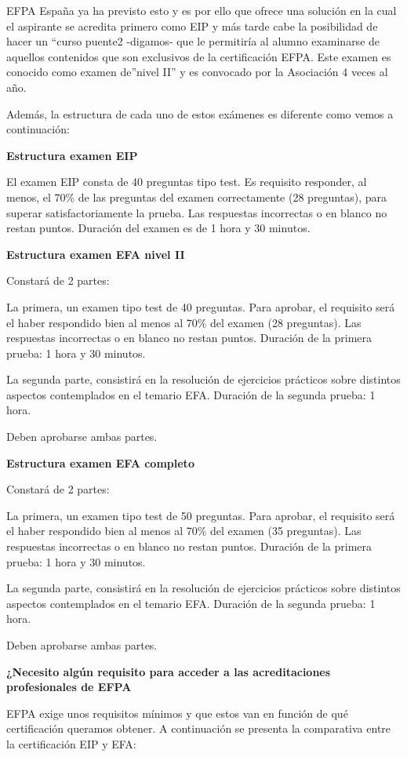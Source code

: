 \documentclass[
  letterpaper,
  DIV=11,
  numbers=noendperiod]{scrreprt}
\begin{document}
EFPA España ya ha previsto esto y es por ello que ofrece una solución en
la cual el aspirante se acredita primero como EIP y más tarde cabe la
posibilidad de hacer un ``curso puente2 -digamos- que le permitiría al
alumno examinarse de aquellos contenidos que son exclusivos de la
certificación EFPA. Este examen es conocido como examen de''nivel II'' y
es convocado por la Asociación 4 veces al año.

Además, la estructura de cada uno de estos exámenes es diferente como
vemos a continuación:

\textbf{Estructura examen EIP}

El examen EIP consta de 40 preguntas tipo test. Es requisito responder,
al menos, el 70\% de las preguntas del examen correctamente (28
preguntas), para superar satisfactoriamente la prueba. Las respuestas
incorrectas o en blanco no restan puntos. Duración del examen es de 1
hora y 30 minutos.

\textbf{Estructura examen EFA nivel II}

Constará de 2 partes:

La primera, un examen tipo test de 40 preguntas. Para aprobar, el
requisito será el haber respondido bien al menos al 70\% del examen (28
preguntas). Las respuestas incorrectas o en blanco no restan puntos.
Duración de la primera prueba: 1 hora y 30 minutos.

La segunda parte, consistirá en la resolución de ejercicios prácticos
sobre distintos aspectos contemplados en el temario EFA. Duración de la
segunda prueba: 1 hora.

Deben aprobarse ambas partes.

\textbf{Estructura examen EFA completo}

Constará de 2 partes:

La primera, un examen tipo test de 50 preguntas. Para aprobar, el
requisito será el haber respondido bien al menos al 70\% del examen (35
preguntas). Las respuestas incorrectas o en blanco no restan puntos.
Duración de la primera prueba: 1 hora y 30 minutos.

La segunda parte, consistirá en la resolución de ejercicios prácticos
sobre distintos aspectos contemplados en el temario EFA. Duración de la
segunda prueba: 1 hora.

Deben aprobarse ambas partes.

\textbf{¿Necesito algún requisito para acceder a las acreditaciones
profesionales de EFPA}

EFPA exige unos requisitos mínimos y que estos van en función de qué
certificación queramos obtener. A continuación se presenta la
comparativa entre la certificación EIP y EFA:
\end{document}
